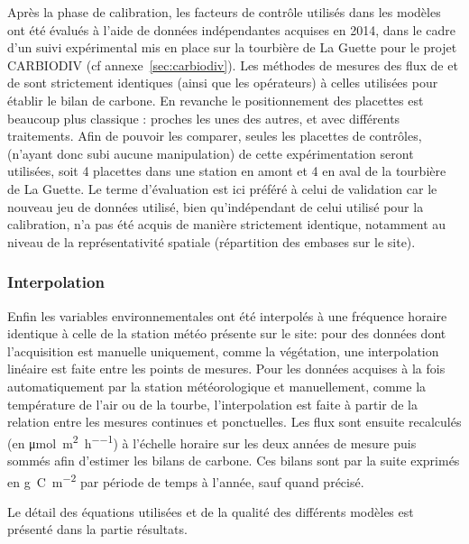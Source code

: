 Après la phase de calibration, les facteurs de contrôle utilisés dans les modèles ont été évalués à l'aide de données indépendantes acquises en 2014, dans le cadre d'un suivi expérimental mis en place sur la tourbière de La Guette pour le projet CARBIODIV (cf annexe~\ref{sec:carbiodiv}).
Les méthodes de mesures des flux de \coo et de \chh sont strictement identiques (ainsi que les opérateurs) à celles utilisées pour établir le bilan de carbone.
En revanche le positionnement des placettes est beaucoup plus classique : proches les unes des autres, et avec différents traitements.
Afin de pouvoir les comparer, seules les placettes de contrôles, (n'ayant donc subi aucune manipulation) de cette expérimentation seront utilisées, soit 4 placettes dans une station en amont et 4 en aval de la tourbière de La Guette.
Le terme d'évaluation est ici préféré à celui de validation car le nouveau jeu de données utilisé, bien qu'indépendant de celui utilisé pour la calibration, n'a pas été acquis de manière strictement identique, notamment au niveau de la représentativité spatiale (répartition des embases sur le site).

\subsubsection{Interpolation}

Enfin les variables environnementales ont été interpolés à une fréquence horaire identique à celle de la station météo présente sur le site:
pour des données dont l'acquisition est manuelle uniquement, comme la végétation, une interpolation linéaire est faite entre les points de mesures.
Pour les données acquises à la fois automatiquement par la station météorologique et manuellement, comme la température de l'air ou de la tourbe, l'interpolation est faite à partir de la relation entre les mesures continues et ponctuelles.
Les flux sont ensuite recalculés (en \si{\micro\mole\per\square\meter\per\hour}) à l'échelle horaire sur les deux années de mesure puis sommés afin d'estimer les bilans de carbone.
Ces bilans sont par la suite exprimés en \si{\gram C m^{-2}} par période de temps à l'année, sauf quand précisé.

Le détail des équations utilisées et de la qualité des différents modèles est présenté dans la partie résultats.

